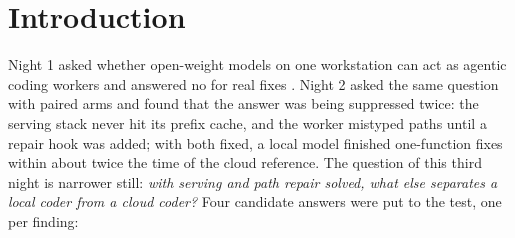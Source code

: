 \begin{center}
\begin{minipage}{0.86\textwidth}
\end{minipage}
\end{center}


\clearpage


\tableofcontents
\listoftables
\clearpage

\renewcommand{\sectionmark}[1]{\markboth{\thesection.\ #1}{\thesection.\ #1}}
\renewcommand{\subsectionmark}[1]{}


\section{Introduction}\label{sec:intro}

Night 1 asked whether open-weight models on one workstation can act as agentic coding workers and answered no for
real fixes \citep{Anthropic-2026aa}. Night 2 asked the same question with paired arms and found that the answer
was being suppressed twice: the serving stack never hit its prefix cache, and the worker mistyped paths until a
repair hook was added; with both fixed, a local model finished one-function fixes within about twice the time of
the cloud reference. The question of this third night is narrower still: \emph{with serving and path repair
solved, what else separates a local coder from a cloud coder?} Four candidate answers were put to the test, one
per finding:

